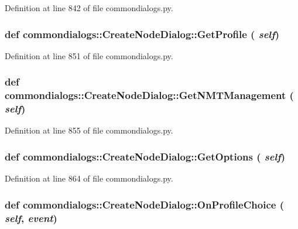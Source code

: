Definition at line 842 of file commondialogs.py.\hypertarget{classcommondialogs_1_1CreateNodeDialog_2329fe0564d06a39130520ba83a22caf}{
\subsubsection[GetProfile]{\setlength{\rightskip}{0pt plus 5cm}def commondialogs::Create\-Node\-Dialog::Get\-Profile ( {\em self})}}
\label{classcommondialogs_1_1CreateNodeDialog_2329fe0564d06a39130520ba83a22caf}




Definition at line 851 of file commondialogs.py.\hypertarget{classcommondialogs_1_1CreateNodeDialog_e224099d30206d623fcc567101b613d6}{
\subsubsection[GetNMTManagement]{\setlength{\rightskip}{0pt plus 5cm}def commondialogs::Create\-Node\-Dialog::Get\-NMTManagement ( {\em self})}}
\label{classcommondialogs_1_1CreateNodeDialog_e224099d30206d623fcc567101b613d6}




Definition at line 855 of file commondialogs.py.\hypertarget{classcommondialogs_1_1CreateNodeDialog_02ed8598e287a76055b4524fbf56278d}{
\subsubsection[GetOptions]{\setlength{\rightskip}{0pt plus 5cm}def commondialogs::Create\-Node\-Dialog::Get\-Options ( {\em self})}}
\label{classcommondialogs_1_1CreateNodeDialog_02ed8598e287a76055b4524fbf56278d}




Definition at line 864 of file commondialogs.py.\hypertarget{classcommondialogs_1_1CreateNodeDialog_145fc2276fd439e7d4bca53aff3a467a}{
\subsubsection[OnProfileChoice]{\setlength{\rightskip}{0pt plus 5cm}def commondialogs::Create\-Node\-Dialog::On\-Profile\-Choice ( {\em self},  {\em event})}}
\label{classcommondialogs_1_1CreateNodeDialog_145fc2276fd439e7d4bca53aff3a467a}




